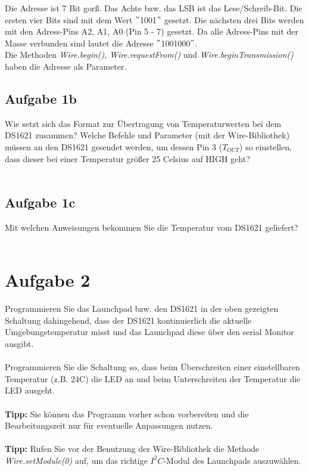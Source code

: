 \noindent Die Adresse ist 7 Bit gor\ss{}. Das Achte bzw. das LSB ist das Lese/Schreib-Bit. Die ersten vier Bits sind mit dem Wert $"$1001$"$ gesetzt. Die nächsten drei Bits werden mit den Adress-Pins A2, A1, A0 (Pin 5 - 7) gesetzt. Da alle Adress-Pins mit der Masse verbunden sind lautet die Adresse $"$1001000$"$.\\
Die Methoden \textit{Wire.begin()}, \textit{Wire.requestFrom()} und \textit{Wire.beginTransmission()} haben die Adresse als Parameter.
\subsection{Aufgabe 1b}
Wie setzt sich das Format zur Übertragung von Temperaturwerten bei dem DS1621 zusammen? Welche Befehle und Parameter (mit der Wire-Bibliothek) müssen an den DS1621 gesendet werden, um dessen Pin 3 ($T_{OUT}$) so einstellen, dass dieser bei einer Temperatur grö\ss{}er 25\textdegree{} Celsius auf HIGH geht?\\ \\

\subsection{Aufgabe 1c}
Mit welchen Anweisungen bekommen Sie die Temperatur vom DS1621 geliefert?\\ \\

\section{Aufgabe 2}
Programmieren Sie das Launchpad bzw. den DS1621 in der oben gezeigten Schaltung dahingehend, dass der DS1621 kontinuierlich die aktuelle Umgebungstemperatur misst und das Launchpad diese über den serial Monitor ausgibt.\\ \\
Programmieren Sie die Schaltung so, dass beim Überschreiten einer einstellbaren Temperatur (z.B. 24\textdegree{}C) die LED an und beim Unterschreiten der Temperatur die LED ausgeht.\\ \\
\textbf{Tipp:} Sie können das Programm vorher schon vorbereiten und die Bearbeitungszeit nur für eventuelle Anpassungen nutzen.\\ \\
\textbf{Tipp:} Rufen Sie vor der Benutzung der Wire-Bibliothek die Methode\\
\textit{Wire.setModule(0)} auf, um das richtige $I^2C$-Modul des Launchpads auszuwählen.\\ \\
